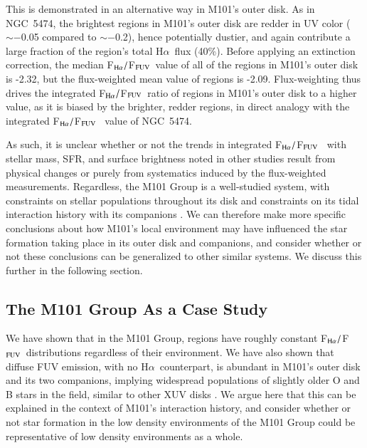 \documentclass[iop]{emulateapj}
\newcommand{\ha}{H$\alpha$}
\newcommand{\hafuv}{F$_{\rm H\alpha}/$F$_{\rm FUV}$}
\begin{document}
This is demonstrated in an alternative way in M101's outer disk.  As in
NGC~5474, the brightest regions in M101's outer disk are redder in UV
color ($\sim -$0.05 compared to $\sim -$0.2), hence potentially dustier,
and again contribute a large fraction of the region's total \ha \ flux (40\%).
Before applying an extinction correction, the median \hafuv \ value of
all of the  regions in M101's outer disk is -2.32, but the
flux-weighted mean value of  regions is -2.09.
Flux-weighting thus drives the integrated \hafuv \ ratio of 
regions in M101's outer disk to a higher value, as it is biased by the
brighter, redder regions, in direct analogy with the integrated \hafuv
\ value of NGC~5474.

As such, it is unclear whether or not the trends in integrated \hafuv
\ with stellar mass, SFR, and surface brightness noted in other
studies result from physical changes or purely from systematics
induced by the flux-weighted measurements.  Regardless, the M101 Group
is a well-studied system, with constraints on stellar populations
throughout its disk and constraints on its tidal interaction history
with its companions \citep[e.g.][]{beale69, rownd94, waller97,
  mihos13}.  We can therefore make more specific conclusions about
how M101's local environment may have influenced the star formation
taking place in its outer disk and companions, and consider whether or
not these conclusions can be generalized to other similar systems.  We
discuss this further in the following section.

\subsection{The M101 Group As a Case Study}

We have shown that in the M101 Group,  regions have roughly
constant \hafuv \ distributions regardless of their environment.  We
have also shown that diffuse FUV emission, with no \ha \ counterpart,
is abundant in M101's outer disk and its two companions, implying
widespread populations of slightly older O and B stars in the field,
similar to other XUV disks \citep[e.g.][]{gildepaz05, thilker05}.  We
argue here that this can be explained in the context of M101's
interaction history, and consider whether or not star formation in the
low density environments of the M101 Group could be representative of
low density environments as a whole.
\end{document}

